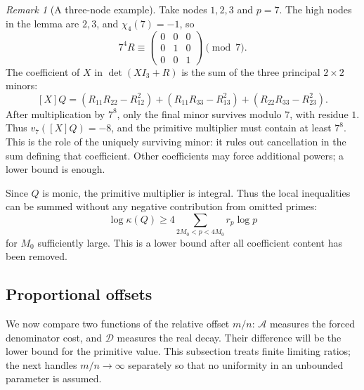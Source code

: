 \documentclass[11pt]{article}
\theoremstyle{definition}
\theoremstyle{remark}
\newtheorem{remark}[theorem]{Remark}
\numberwithin{equation}{section}
\begin{document}
\begin{remark}[A three-node example]\label{rem:prime-example}
Take nodes $1,2,3$ and $p=7$. The high nodes in the lemma are $2,3$,
and $\chi_4(7)=-1$, so
\[
 7^4 R\equiv\begin{pmatrix}0&0&0\\0&1&0\\0&0&1\end{pmatrix}\pmod7.
\]
The coefficient of $X$ in $\det(XI_3+R)$ is the sum of the three
principal $2\times2$ minors:
\[
 [X]Q=(R_{11}R_{22}-R_{12}^2)
       +(R_{11}R_{33}-R_{13}^2)
       +(R_{22}R_{33}-R_{23}^2).
\]
After multiplication by $7^8$, only the final minor survives modulo
$7$, with residue $1$. Thus $v_7([X]Q)=-8$, and the primitive multiplier
must contain at least $7^8$. This is the role of the uniquely surviving
minor: it rules out cancellation in the sum defining that coefficient.
Other coefficients may force additional powers; a lower bound is enough.
\end{remark}

Since $Q$ is monic, the primitive multiplier is integral. Thus the local
inequalities can be summed without any negative contribution from omitted
primes:
\begin{equation}\label{eq:principal-sum}
 \log\kappa(Q)\geq
 4\sum_{2M_0<p<4M_0}r_p\log p
\end{equation}
for $M_0$ sufficiently large. This is a lower bound after all coefficient
content has been removed.

\subsection{Proportional offsets}

We now compare two functions of the relative offset $m/n$:
$\mathcal A$ measures the forced denominator cost, and $\mathcal D$
measures the real decay. Their difference will be the lower bound
for the primitive value. This subsection treats finite limiting
ratios; the next handles $m/n\to\infty$ separately so that no
uniformity in an unbounded parameter is assumed.
\end{document}
